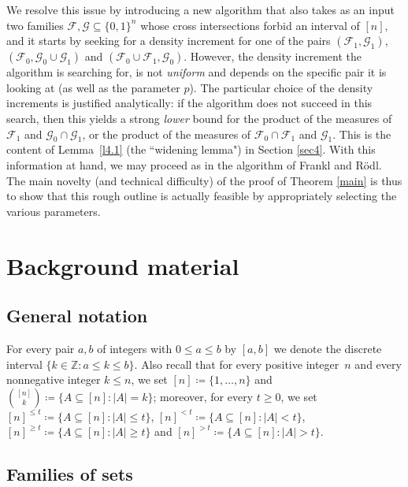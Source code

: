 \documentclass[10pt,a4paper]{amsart}
\theoremstyle{remark}
\newcommand{\meg}{\geqslant}
\newcommand{\mik}{\leqslant}
\newcommand{\Fcal}{\mathcal{F}}
\newcommand{\Gcal}{\mathcal{G}}
\begin{document}
We resolve this issue by introducing a new algorithm that also takes as an input two families
$\Fcal,\Gcal\subseteq \{0,1\}^n$ whose cross intersections forbid an interval of $[n]$, and it starts by seeking
for a density increment for one of the pairs $(\Fcal_1,\Gcal_1)$, $(\Fcal_0, \Gcal_0\cup \Gcal_1)$
and $(\Fcal_0\cup\Fcal_1, \Gcal_0)$. However, the density increment the algorithm is searching for,
is not \textit{uniform} and depends on the specific pair it is looking at (as well as the parameter $p$).
The particular choice of the density increments is justified analytically: if the algorithm does not
succeed in this search, then this yields a strong \textit{lower} bound for the product of the measures
of $\Fcal_1$ and $\Gcal_0\cap \Gcal_1$, or the product of the measures of $\Fcal_0\cap\Fcal_1$
and $\Gcal_1$. This is the content of Lemma~\ref{l4.1} (the ``widening lemma") in Section \ref{sec4}.
With this information at hand, we may proceed as in the algorithm of Frankl and R\"{o}dl.
The main novelty (and technical difficulty) of the proof of Theorem \ref{main} is thus to show
that this rough outline is actually feasible by appropriately selecting the various parameters.


\section{Background material} \label{sec2}

\subsection{General notation} \label{subsec2.1}

For every pair $a,b$ of integers with $0\mik a\mik b$ by $[a,b]$ we denote the discrete
interval $\{k\in\mathbb{Z}: a\mik k \mik b\}$. Also recall that for every positive integer~$n$
and every nonnegative integer $k\mik n$, we set $[n]\coloneqq \{1,\dots,n\}$ and
$\binom{[n]}{k}\coloneqq\{A\subseteq [n]: |A|=k\}$; moreover, for every
$t\meg 0$, we set $[n]^{\mik t}\coloneqq \{A\subseteq [n]: |A|\mik t\}$,
$[n]^{<t}\coloneqq \{A\subseteq [n]: |A|<t\}$,
$[n]^{\meg t}\coloneqq \{A\subseteq [n]: |A|\meg t\}$ and
$[n]^{>t}\coloneqq \{A\subseteq [n]: |A|>t\}$.

\subsection{Families of sets} \label{subsec2.2}
\end{document}
